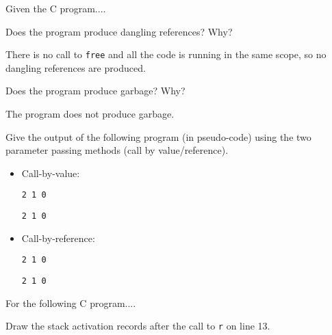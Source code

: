 \documentclass[12pt,letterpaper]{hmcpset}
\begin{document}
\begin{problem}[1]
Given the C program....
\end{problem}

\begin{problem}[1a]
Does the program produce dangling references? Why?
\end{problem}
\begin{solution}
There is no call to \texttt{free} and all the code is running in the same scope, so no dangling references are produced.
\end{solution}

\begin{problem}[1b]
Does the program produce garbage? Why?
\end{problem}
\begin{solution}
The program does not produce garbage.
\end{solution}

\begin{problem}[2]
Give the output of the following program (in pseudo-code) using the two parameter passing methods (call by value/reference).
\end{problem}
\begin{solution}
\begin{itemize}
\item Call-by-value:

\verb|2 1 0|

\verb|2 1 0|

\item Call-by-reference:

\verb|2 1 0|

\verb|2 1 0|
\end{itemize}
\end{solution}


\begin{problem}[3]
For the following C program....
\end{problem}

\begin{problem}[3a]
Draw the stack activation records after the call to \texttt{r} on line 13.
\end{problem}

\begin{solution}
\begin{drawstack}
\startframe
{}
\startframe
{}
\startframe
{} 
\startframe
{} 
\end{drawstack}
\end{solution}
\end{document}
